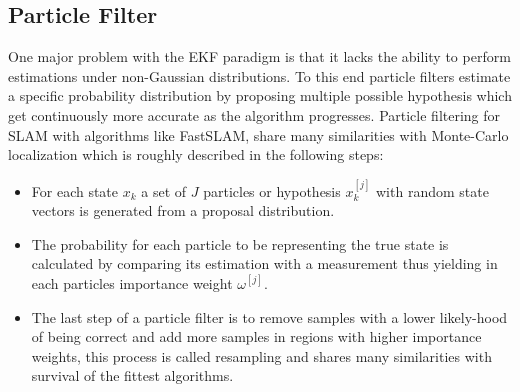 


\subsection{Particle Filter}
One major problem with the EKF paradigm is that it lacks the ability to perform estimations under non-Gaussian distributions. 
To this end particle filters estimate a specific probability distribution by proposing multiple possible hypothesis which get continuously more accurate as the algorithm progresses. 
Particle filtering for SLAM with algorithms like FastSLAM, share many similarities with Monte-Carlo localization which is roughly described in the following steps:
\begin{itemize}
	\item For each state $ x_{k} $ a set of $J$ particles or hypothesis 
	$ x_{k}^{[j]} $ with random state vectors is generated from a proposal distribution. 
	\item The probability for each particle to be representing the true state is calculated by comparing its estimation with a measurement thus yielding in each particles importance weight $ \omega^{[j]} $.
	\item The last step of a particle filter is to remove samples with a lower likely-hood of being correct and add more samples in regions with higher importance weights, this process is called resampling and shares many similarities with survival of the fittest algorithms.
\end{itemize}

